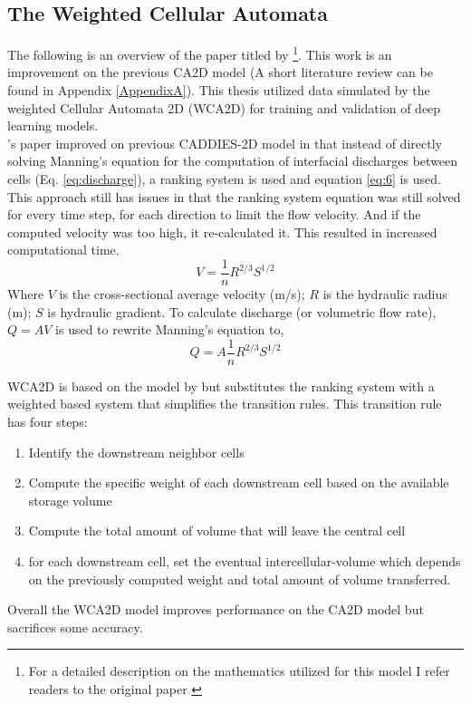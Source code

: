 \subsection*{The Weighted Cellular Automata}
The following is an overview of the paper titled   by \citeauthor{guidolin2016weighted} \footnote{For a detailed description on the mathematics utilized for this model I refer readers to the original paper \cite{guidolin2016weighted}}. This work is an improvement on the previous CA2D model (A short literature review can be found in Appendix \ref{AppendixA}). This thesis utilized data simulated by the weighted Cellular Automata 2D (WCA2D) for training and validation of deep learning models.\\

\citeauthor{Ghimire}'s paper improved on previous CADDIES-2D model in that instead of directly solving Manning's equation for the computation of interfacial discharges between cells (Eq. \ref{eq:discharge}), a ranking system is used and equation \ref{eq:6} is used. This approach still has issues in that the ranking system equation was still solved for every time step, for each direction to limit the flow velocity. And if the computed velocity was too high, it re-calculated it. This resulted in increased computational time.
\begin{equation}
	\label{eq:manning}
	V = \frac{1}{n} {R}^{2/3}S^{1/2}
\end{equation}
Where $V$ is the cross-sectional average velocity (m/s); $R$ is the hydraulic radius (m); $S$ is hydraulic gradient. To calculate discharge (or volumetric flow rate), $Q = AV$ is used to rewrite Manning's equation to,
\begin{equation}
	\label{eq:discharge}
	Q = A \frac{1}{n} {R}^{2/3}S^{1/2}
\end{equation}

WCA2D is based on the model by \citeauthor{Ghimire} but substitutes the ranking system with a weighted based system that simplifies the transition rules. This transition rule has four steps:
\begin{enumerate}
	\item Identify the downstream neighbor cells
	\item Compute the specific weight of each downstream cell based on the available storage volume
	\item Compute the total amount of volume that will leave the central cell
	\item for each downstream cell, set the eventual intercellular-volume which depends on the previously computed weight and total amount of volume transferred.
\end{enumerate}

Overall the WCA2D model improves performance on the CA2D model but sacrifices some accuracy.
